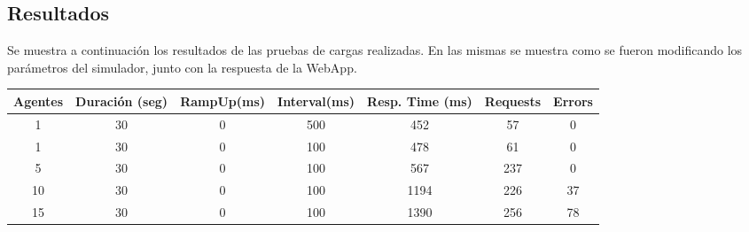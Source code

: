 \documentclass[a4paper,10pt]{article}
\begin{document}
        \subsection{Resultados}
            Se muestra a continuación los resultados de las pruebas de cargas realizadas. En las mismas se muestra
            como se fueron modificando los parámetros del simulador, junto con la respuesta de la WebApp. 

            \vspace{1cm}
            \hspace*{-3cm} 
            \begin{tabular}{|c|c|c|c|c|c|c|}
                \hline
                \textbf{Agentes} & \textbf{Duración (seg)} & \textbf{RampUp(ms)} & \textbf{Interval(ms)} & \textbf{Resp. Time (ms)} & \textbf{Requests} & \textbf{Errors} \\
                \hline
                1 & 30 & 0 & 500 & 452 & 57 & 0 \\
                \hline 
                1 & 30 & 0 & 100 & 478 & 61 & 0 \\
                \hline 
                5 & 30 & 0 & 100 & 567 & 237 & 0 \\
                \hline 
                10 & 30 & 0 & 100 & 1194 & 226 & 37 \\
                \hline 
                15 & 30 & 0 & 100 & 1390 & 256 & 78 \\
                \hline 
            \end{tabular}
\end{document}
